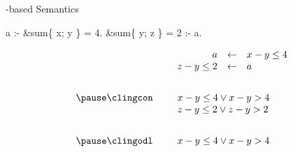 \begin{frame}[fragile]{\HTC-based Semantics}
    \begin{semiverbatim}
                     a :- &sum\{ x; y \} = 4.
      &sum\{ y; z \} = 2 :- a.
  \end{semiverbatim}
  \bigskip
  \[
    \begin{array}{rp{5pt}rcl}
                     && a         &\leftarrow&  x-y\leq 4          \\
                     && z-y\leq2  &\leftarrow&  a                  \\[20pt]\pause
    \text{\clingcon} && \multicolumn{3}{l}{x-y\leq 4 \lor x-y > 4} \\
                     && \multicolumn{3}{l}{z-y\leq 2 \lor z-y>2}   \\[20pt]\pause
    \text{\clingodl} && \multicolumn{3}{l}{x-y\leq 4 \lor x-y > 4}
    \end{array}
  \]
\end{frame}
%

